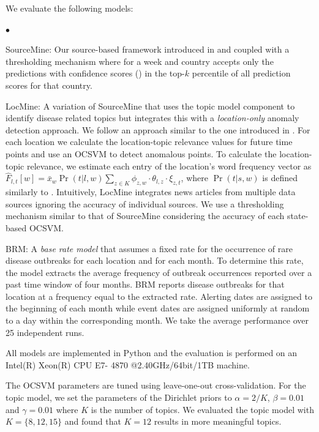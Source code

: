 \documentclass[conference]{IEEEtran}
\newcommand{\squishlist}{
   \begin{list}{$\bullet$}
    {
      \setlength{\itemsep}{0pt}
      \setlength{\parsep}{3pt}
      \setlength{\topsep}{3pt}
      \setlength{\partopsep}{0pt}
      \setlength{\leftmargin}{1.5em}
      \setlength{\labelwidth}{1em}
      \setlength{\labelsep}{0.5em} } }
\newcommand{\squishend}{
    \end{list}  }
\newcommand{\fullmodel}{{{\sf SourceMine}}\xspace}
\newcommand{\locationmodel}{{\sf LocMine}\xspace}
\begin{document}
 We evaluate the following models:
\squishlist
\item \fullmodel: Our source-based framework introduced in  and  coupled with a thresholding mechanism where for a week and country accepts only the predictions with confidence scores () in the top-$k$ percentile of all prediction scores for that country.
\item \locationmodel: A variation of \fullmodel that uses the topic model component to identify disease related topics but integrates this with a {\em location-only} anomaly detection approach. We follow an approach similar to the one introduced in . For each location we calculate the location-topic relevance values for future time points and use an OCSVM  to detect anomalous points. To calculate the location-topic relevance, we estimate each entry of the location's word frequency vector as $\hat{F}_{l,t}[w] = \bar{x}_{w} \Pr(t|l,w) \sum_{z \in K}\phi_{z,w}\cdot \theta_{l,z} \cdot \xi_{z,t}$, where $\Pr(t|s,w)$ is defined similarly to . Intuitively,  \locationmodel integrates news articles from multiple data sources ignoring the accuracy of individual sources. We use a thresholding mechanism similar to that of \fullmodel considering the accuracy of each state-based OCSVM. 
\item BRM: A {\em base rate model} that assumes a fixed rate for the occurrence of rare disease outbreaks for each location and for each
month. To determine this rate, the model extracts the average frequency of outbreak occurrences reported over a past time window of four months. BRM reports disease outbreaks for that location at a frequency equal to the extracted rate. Alerting dates are assigned to the beginning of each month while event dates are assigned uniformly at random to a day within the corresponding month. We take the average performance over 25 independent runs.
\squishend
All models are implemented in Python and the evaluation is performed on an Intel(R) Xeon(R) CPU E7- 4870 @2.40GHz/64bit/1TB machine. 


 The OCSVM parameters are tuned using leave-one-out cross-validation. For the topic model, we set the parameters of the Dirichlet priors to $\alpha = 2/K$, $\beta = 0.01$ and $\gamma = 0.01$ where $K$ is the number of topics. We evaluated the topic model with $K = \{8, 12, 15\}$ and found that $K=12$ results in more meaningful topics.  
\end{document}
